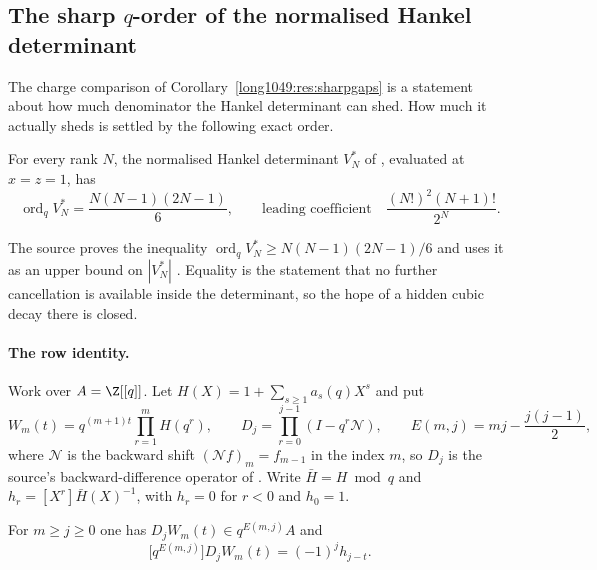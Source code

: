 \documentclass[11pt]{article}
\begin{document}
\subsection{The sharp $q$-order of the normalised Hankel
determinant}\label{long1049:sec:hankel-order}

The charge comparison of Corollary~\ref{long1049:res:sharpgaps} is a statement about how
much denominator the Hankel determinant can shed.  How much it actually sheds
is settled by the following exact order.

\begin{theorem}\label{long1049:res:zudilin-sharp-qorder}
For every rank $N$, the normalised Hankel determinant $V_N^{*}$ of
\cite[Sec.~4]{zudilin2016}, evaluated at $x=z=1$, has
\[
 \operatorname{ord}_q V_N^{*}=\frac{N(N-1)(2N-1)}{6},
 \qquad
 \text{leading coefficient}\quad\frac{(N!)^{2}(N+1)!}{2^{N}} .
\]
\end{theorem}

\noindent The source proves the inequality
$\operatorname{ord}_q V_N^{*}\ge N(N-1)(2N-1)/6$ and uses it as an upper bound
on $|V_N^{*}|$ \cite[Sec.~4]{zudilin2016}.  Equality is the statement that no
further cancellation is available inside the determinant, so the hope of a
hidden cubic decay there is closed.

\paragraph{The row identity.}
Work over $A=\Z[[q]]$.  Let $H(X)=1+\sum_{s\ge1}a_s(q)X^{s}$ and put
\[
 W_m(t)=q^{(m+1)t}\prod_{r=1}^{m}H(q^{r}),
 \qquad
 D_j=\prod_{r=0}^{j-1}(I-q^{r}\mathcal N),
 \qquad
 E(m,j)=mj-\frac{j(j-1)}2,
\]
where $\mathcal N$ is the backward shift $(\mathcal Nf)_m=f_{m-1}$ in the index
$m$, so $D_j$ is the source's backward-difference operator of
\cite[Sec.~4]{zudilin2016}.  Write $\bar H=H\bmod q$ and
$h_r=[X^{r}]\bar H(X)^{-1}$, with $h_r=0$ for $r<0$ and $h_0=1$.

\begin{lemma}\label{long1049:res:allrowinitial}
For $m\ge j\ge0$ one has $D_jW_m(t)\in q^{E(m,j)}A$ and
\[
 \bigl[q^{E(m,j)}\bigr]D_jW_m(t)=(-1)^{j}h_{j-t}.
\]
\end{lemma}
\end{document}
